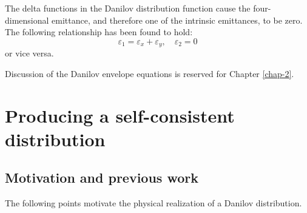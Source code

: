 The delta functions in the Danilov distribution function cause the four-dimensional emittance, and therefore one of the intrinsic emittances, to be zero. The following relationship has been found to hold:
%
\begin{equation} \label{eq:mode_emittances2}
    \varepsilon_1 = \varepsilon_x + \varepsilon_y, \quad
    \varepsilon_2 = 0
\end{equation}
%
or vice versa. 

Discussion of the Danilov envelope equations is reserved for Chapter \ref{chap-2}.




\section{Producing a self-consistent distribution}\label{sec:Producing a self-consistent distribution}


\subsection{Motivation and previous work}

The following points motivate the physical realization of a Danilov distribution.

